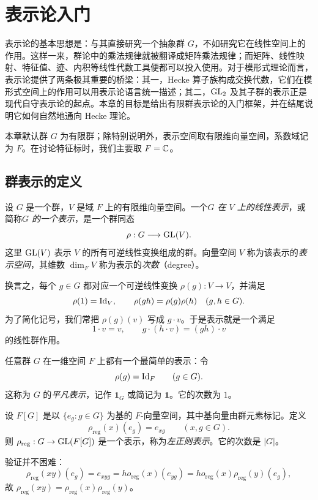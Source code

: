 \chapter{表示论入门}

表示论的基本思想是：与其直接研究一个抽象群 $G$，不如研究它在线性空间上的作用。这样一来，群论中的乘法规律就被翻译成矩阵乘法规律；而矩阵、线性映射、特征值、迹、内积等线性代数工具便都可以投入使用。对于模形式理论而言，表示论提供了两条极其重要的桥梁：其一，Hecke 算子族构成交换代数，它们在模形式空间上的作用可以用表示论语言统一描述；其二，$\mathrm{GL}_2$ 及其子群的表示正是现代自守表示论的起点。本章的目标是给出有限群表示论的入门框架，并在结尾说明它如何自然地通向 Hecke 理论。

本章默认群 $G$ 为有限群；除特别说明外，表示空间取有限维向量空间，系数域记为 $F$。在讨论特征标时，我们主要取 $F=\mathbb{C}$。

\section{群表示的定义}

\begin{definition}
设 $G$ 是一个群，$V$ 是域 $F$ 上的有限维向量空间。一个\emph{$G$ 在 $V$ 上的线性表示}，或简称\emph{$G$ 的一个表示}，是一个群同态
\[
\rho:G\longrightarrow \mathrm{GL}(V).
\]
这里 $\mathrm{GL}(V)$ 表示 $V$ 的所有可逆线性变换组成的群。向量空间 $V$ 称为该表示的\emph{表示空间}，其维数 $\dim_F V$ 称为表示的\emph{次数}（degree）。
\end{definition}

换言之，每个 $g\in G$ 都对应一个可逆线性变换 $\rho(g):V\to V$，并满足
\[
\rho(1)=\mathrm{Id}_V,\qquad \rho(gh)=\rho(g)\rho(h)\quad (g,h\in G).
\]
为了简化记号，我们常把 $\rho(g)(v)$ 写成 $g\cdot v$。于是表示就是一个满足
\[
1\cdot v=v,\qquad g\cdot(h\cdot v)=(gh)\cdot v
\]
的线性群作用。

\begin{example}[平凡表示]
任意群 $G$ 在一维空间 $F$ 上都有一个最简单的表示：令
\[
\rho(g)=\mathrm{Id}_F\qquad (g\in G).
\]
这称为 $G$ 的\emph{平凡表示}，记作 $\mathbf{1}_G$ 或简记为 $\mathbf{1}$。它的次数为 $1$。
\end{example}

\begin{example}[正则表示]
设 $F[G]$ 是以 $\{e_g:g\in G\}$ 为基的 $F$-向量空间，其中基向量由群元素标记。定义
\[
\rho_{\mathrm{reg}}(x)(e_g)=e_{xg}\qquad (x,g\in G).
\]
则 $\rho_{\mathrm{reg}}:G\to \mathrm{GL}(F[G])$ 是一个表示，称为\emph{左正则表示}。它的次数是 $|G|$。

验证并不困难：
\[
\rho_{\mathrm{reg}}(xy)(e_g)=e_{xyg}=
ho_{\mathrm{reg}}(x)(e_{yg})
=
ho_{\mathrm{reg}}(x)\rho_{\mathrm{reg}}(y)(e_g),
\]
故 $\rho_{\mathrm{reg}}(xy)=\rho_{\mathrm{reg}}(x)\rho_{\mathrm{reg}}(y)$。
\end{example}

